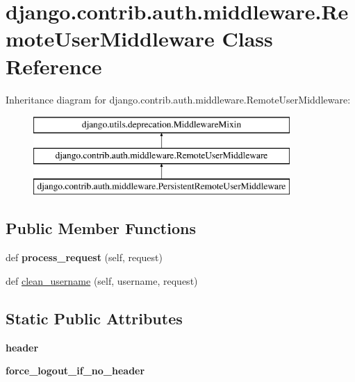 \hypertarget{classdjango_1_1contrib_1_1auth_1_1middleware_1_1_remote_user_middleware}{}\section{django.\+contrib.\+auth.\+middleware.\+Remote\+User\+Middleware Class Reference}
\label{classdjango_1_1contrib_1_1auth_1_1middleware_1_1_remote_user_middleware}
Inheritance diagram for django.\+contrib.\+auth.\+middleware.\+Remote\+User\+Middleware\+:\begin{figure}[H]
\begin{center}
\leavevmode
\includegraphics[height=3.000000cm]{classdjango_1_1contrib_1_1auth_1_1middleware_1_1_remote_user_middleware}
\end{center}
\end{figure}
\subsection*{Public Member Functions}
\begin{DoxyCompactItemize}
\item 
\mbox{\label{classdjango_1_1contrib_1_1auth_1_1middleware_1_1_remote_user_middleware_a6dfcaf05bf8b7a0617ed19a11d35f550}} 
def {\bfseries process\+\_\+request} (self, request)
\item 
def \mbox{\hyperlink{classdjango_1_1contrib_1_1auth_1_1middleware_1_1_remote_user_middleware_adf328662e2d470e0cde2d82721308296}{clean\+\_\+username}} (self, username, request)
\end{DoxyCompactItemize}
\subsection*{Static Public Attributes}
\begin{DoxyCompactItemize}
\item 
\mbox{\label{classdjango_1_1contrib_1_1auth_1_1middleware_1_1_remote_user_middleware_aa26e5855b9ea094142fc09c113e58a71}} 
{\bfseries header}
\item 
\mbox{\label{classdjango_1_1contrib_1_1auth_1_1middleware_1_1_remote_user_middleware_a1f14f9f06d1045f3865fed7665e9fabf}} 
{\bfseries force\+\_\+logout\+\_\+if\+\_\+no\+\_\+header}
\end{DoxyCompactItemize}
